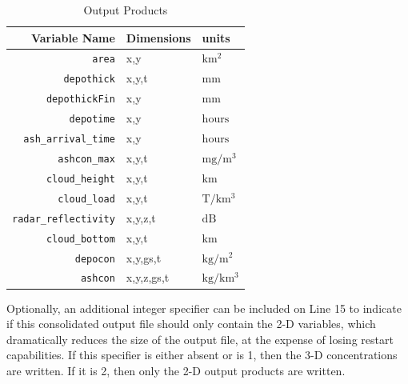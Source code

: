 \small
\begin{table}[htbp]
\begin{center}
\begin{tabular}{|r|l|l|}
\hline
Variable Name                & Dimensions & units\\
\hline
\texttt{area}                & x,y        & $\mathrm{km^2}$   \\
\texttt{depothick}           & x,y,t      & $\mathrm{mm}$     \\
\texttt{depothickFin}        & x,y        & $\mathrm{mm}$     \\
\texttt{depotime}            & x,y        & $\mathrm{hours}$  \\
\texttt{ash\_arrival\_time}  & x,y        & $\mathrm{hours}$  \\
\texttt{ashcon\_max}         & x,y,t      & $\mathrm{mg/m^3}$ \\
\texttt{cloud\_height}       & x,y,t      & $\mathrm{km}$     \\
\texttt{cloud\_load}         & x,y,t      & $\mathrm{T/km^3}$ \\
\texttt{radar\_reflectivity} & x,y,z,t    & $\mathrm{dB}$     \\
\texttt{cloud\_bottom}       & x,y,t      & $\mathrm{km}$     \\
\texttt{depocon}             & x,y,gs,t   & $\mathrm{kg/m^2}$ \\
\texttt{ashcon}              & x,y,z,gs,t & $\mathrm{kg/km^3}$\\
\hline
\end{tabular}
\caption{\label{tab:OutputProduct}Output Products}
\end{center}
\end{table}
\normalsize

Optionally, an additional integer specifier can be included on
Line 15 to indicate if this consolidated output file should only contain the
2-D variables, which dramatically reduces the size of the output file, at the
expense of losing restart capabilities.
If this specifier is either absent or is 1, then the 3-D concentrations are written.
If it is 2, then only the 2-D output products are written.

